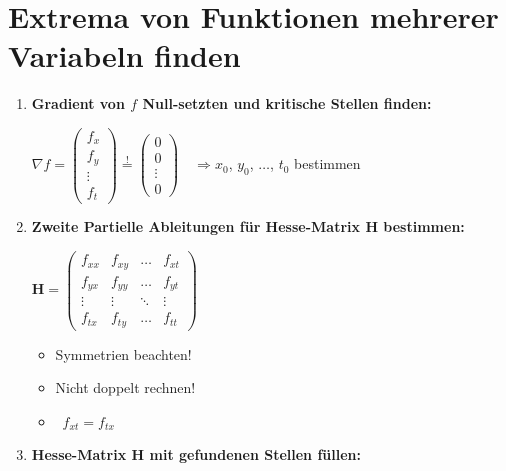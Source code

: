 \newpage
\section{Extrema von Funktionen mehrerer Variabeln finden}

\begin{enumerate}[itemsep=1ex]
    \item \textbf{Gradient von $f$ Null-setzten und kritische Stellen finden:}
    
    $\nabla f=
    \begin{pmatrix}
        f_x\\
        f_y\\
        \vdots \\
        f_t
    \end{pmatrix} \stackrel{!}{=}
    \begin{pmatrix}
        0\\
        0\\
        \vdots \\
        0
    \end{pmatrix}
    \quad \Rightarrow x_0$, $y_0$, $\ldots$, $t_0$ bestimmen
    
    \item \textbf{Zweite Partielle Ableitungen für Hesse-Matrix H bestimmen:}
    
    \begin{minipage}[t]{0.48\columnwidth}
        $\mathbf{H}=\begin{pmatrix}
            f_{xx}&f_{xy}&\ldots &f_{xt}\\
            f_{yx}&f_{yy}&\ldots&f_{yt}\\
            \vdots &\vdots &\ddots &\vdots \\
            f_{tx}&f_{ty}&\ldots&f_{tt}
        \end{pmatrix}$
    \end{minipage}\hfill
    \begin{minipage}[c]{0.48\columnwidth}
        \begin{itemize}
            \item Symmetrien beachten!
            \item Nicht doppelt rechnen!
            \item[] \textrightarrow\ $f_{xt} = f_{tx}$
        \end{itemize}
    \end{minipage}

    \item \textbf{Hesse-Matrix H mit gefundenen Stellen füllen:}


\end{enumerate}
